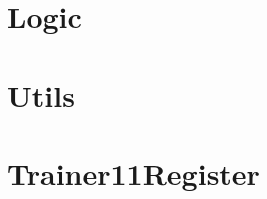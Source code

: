     \section{Logic}
        
    \newpage
    \section{Utils}
        
    \newpage
    \section{Trainer11Register}
        

